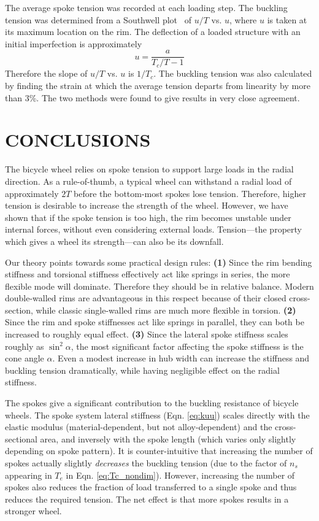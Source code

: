 \documentclass{bmd2016p}
\begin{document}
The average spoke tension was recorded at each loading step. The buckling tension was determined from a Southwell plot~\cite{Timoshenko1961a} of $u/T$ vs. $u$, where $u$ is taken at its maximum location on the rim. The deflection of a loaded structure with an initial imperfection is approximately
	\begin{equation}\label{eq:Southwell}
	u = \frac{a}{T_c/T - 1}
	\end{equation}
Therefore the slope of $u/T$ vs. $u$ is $1/T_c$. The buckling tension was also calculated by finding the strain at which the average tension departs from linearity by more than 3\%. The two methods were found to give results in very close agreement.



\section{CONCLUSIONS}
The bicycle wheel relies on spoke tension to support large loads in the radial direction. As a rule-of-thumb, a typical wheel can withstand a radial load of approximately $2T$ before the bottom-most spokes lose tension. Therefore, higher tension is desirable to increase the strength of the wheel. However, we have shown that if the spoke tension is too high, the rim becomes unstable under internal forces, without even considering external loads. Tension---the property which gives a wheel its strength---can also be its downfall.

Our theory points towards some practical design rules: \textbf{(1)} Since the rim bending stiffness and torsional stiffness effectively act like springs in series, the more flexible mode will dominate. Therefore they should be in relative balance. Modern double-walled rims are advantageous in this respect because of their closed cross-section, while classic single-walled rims are much more flexible in torsion. \textbf{(2)} Since the rim and spoke stiffnesses act like springs in parallel, they can both be increased to roughly equal effect. \textbf{(3)} Since the lateral spoke stiffness scales roughly as $\sin^2{\alpha}$, the most significant factor affecting the spoke stiffness is the cone angle $\alpha$. Even a modest increase in hub width can increase the stiffness and buckling tension dramatically, while having negligible effect on the radial stiffness.

The spokes give a significant contribution to the buckling resistance of bicycle wheels. The spoke system lateral stiffness (Eqn. \ref{eq:kuu}) scales directly with the elastic modulus (material-dependent, but not alloy-dependent) and the cross-sectional area, and inversely with the spoke length (which varies only slightly depending on spoke pattern). It is counter-intuitive that increasing the number of spokes actually slightly \textit{decreases} the buckling tension (due to the factor of $n_s$ appearing in $T_e$ in Eqn. \ref{eq:Tc_nondim}). However, increasing the number of spokes also reduces the fraction of load transferred to a single spoke and thus reduces the required tension. The net effect is that more spokes results in a stronger wheel.
\end{document}
